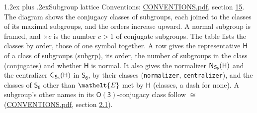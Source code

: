 \documentclass[10pt,a4paper]{article}
\makeatletter
\renewcommand\section{\@startsection{section}{1}{\z@}{-3ex plus -1ex minus -.2ex}%
  {1.2ex plus .2ex}{\normalfont\large\sffamily\bfseries\color{parttitle}}}
\numberwithin{equation}{section}
\newcommand{\eltfont}[1]{{\let\sigma\eltsigma\mathelt{#1}}}
\newcommand{\grp}[1]{\mathsf{#1}}
\newcommand{\cls}[1]{\eltfont{#1}}
\newcommand{\samecls}{\cong}
\newcommand{\hairsp}{\mkern1mu}
\makeatother
\begin{document}
\section{Subgroup lattice}\label{s:subgroups}
Conventions: \href{../../CONVENTIONS.pdf}{CONVENTIONS.pdf}, section \href{../../CONVENTIONS.pdf\#conv.15}{15}.
The diagram shows the conjugacy classes of subgroups, each joined to the classes of its maximal subgroups, and the orders increase upward. \label{n:index.conjugates.c}A normal subgroup is framed, and ${\times}c$ is the number $c > 1$ of conjugate subgroups. The table lists the classes by order, those of one symbol together. \label{n:group.H}\label{n:head.subgroup}\label{n:head.order}\label{n:head.conjugates}\label{n:head.normal}A row gives the representative $\grp{H}$ of a class of subgroups (subgrp), its order, the number of subgroups in the class (conjugates) and whether $\grp{H}$ is normal. \label{n:group.normalizer}\label{n:group.centralizer}\label{n:head.classes}It also gives the normalizer $\grp{N}_{\hairsp \grp{S_{6}}}(\grp{H})$ and the centralizer $\grp{C}_{\hairsp \grp{S_{6}}}(\grp{H})$ in $\grp{S_{6}}$, by their classes (\texttt{normalizer}, \texttt{centralizer}), and the classes of $\grp{S_{6}}$ other than $\cls{E}$ met by $\grp{H}$ (classes, a dash for none). A subgroup's other names in its \href{O3.pdf}{$\grp{O(3)}$}-conjugacy class follow $\samecls$ (\href{../../CONVENTIONS.pdf}{CONVENTIONS.pdf}, section \href{../../CONVENTIONS.pdf\#conv.2.1}{2.1}).
\begin{center}
\end{center}
\end{document}
